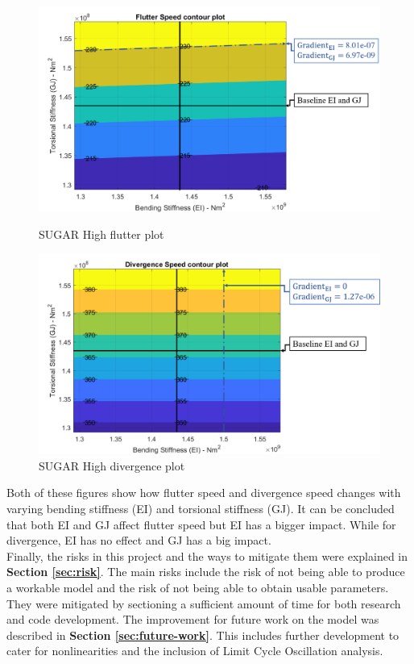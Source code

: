 \documentclass[11pt]{article}
\begin{document}
\begin{figure}[!hbt]
    \begin{minipage}{.5\textwidth}
    \centering
    \includegraphics[width = \textwidth]{figures/flutter.png}
    \caption{SUGAR High flutter plot}
    \label{fig:exec-flutt}
    \end{minipage}%
    \begin{minipage}{.5\textwidth}
    \centering
    \includegraphics[width = \textwidth]{figures/divergence.png}
    \caption{SUGAR High divergence plot}
    \label{fig:exec-div}
    \end{minipage}
\end{figure}
Both of these figures show how flutter speed and divergence speed changes with varying bending stiffness (EI) and torsional stiffness (GJ). It can be concluded that both EI and GJ affect flutter speed but EI has a bigger impact. While for divergence, EI has no effect and GJ has a big impact.\\

Finally, the risks in this project and the ways to mitigate them were explained in \textbf{Section \ref{sec:risk}}. The main risks include the risk of not being able to produce a workable model and the risk of not being able to obtain usable parameters. They were mitigated by sectioning a sufficient amount of time for both research and code development. The improvement for future work on the model was described in \textbf{Section \ref{sec:future-work}}. This includes further development to cater for nonlinearities and the inclusion of Limit Cycle Oscillation analysis. 
\cleardoublepage
\end{document}

